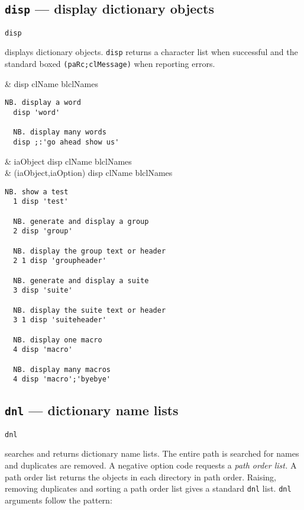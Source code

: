 \subsection{\texttt{disp} --- display dictionary objects}\label{ss:disp} 

\hypertarget{il:disp}{\texttt{disp}} displays dictionary objects. \texttt{disp} returns a character 
list when successful and the standard boxed \verb|(paRc;clMessage)| when reporting errors. 

\begin{wordhead}
\monad & disp clName \argsep blclNames \\
\end{wordhead}
\begin{lstlisting}[frame=single,framerule=0pt]
  NB. display a word 
  disp 'word'     

  NB. display many words 
  disp ;:'go ahead show us' 
\end{lstlisting}

\begin{wordhead}
\dyad & iaObject disp clName \argsep blclNames \\
      & (iaObject,iaOption) disp clName \argsep blclNames \\
\end{wordhead}
\begin{lstlisting}[frame=single,framerule=0pt]
  NB. show a test 
  1 disp 'test'  
  
  NB. generate and display a group 
  2 disp 'group' 

  NB. display the group text or header 
  2 1 disp 'groupheader'     

  NB. generate and display a suite 
  3 disp 'suite' 

  NB. display the suite text or header 
  3 1 disp 'suiteheader'     

  NB. display one macro
  4 disp 'macro' 
  
  NB. display many macros           
  4 disp 'macro';'byebye'    
\end{lstlisting}
  
\subsection{\texttt{dnl} --- dictionary name lists}\label{ss:dnl}

\hypertarget{il:dnl}{\texttt{dnl}} searches and returns dictionary name lists. 
The entire path is searched for names and duplicates are removed. 
A negative option code requests a \emph{path order list.} A path order list returns
 the objects in each directory in path order. 
 Raising, removing duplicates and sorting a path order list gives a 
 standard \texttt{dnl} list. \texttt{dnl} arguments follow the pattern: 


